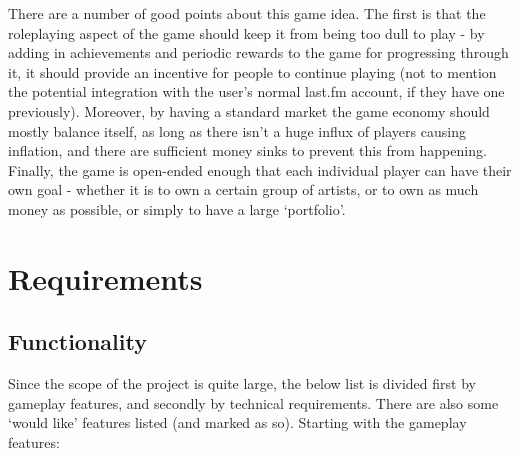 \documentclass[a4paper,10pt,twoside]{article}
\begin{document}
There are a number of good points about this game idea. The first is that the roleplaying aspect of the game should keep it from being too dull to play - by adding in achievements and periodic rewards to the game for progressing through it, it should provide an incentive for people to continue playing (not to mention the potential integration with the user's normal last.fm account, if they have one previously). Moreover, by having a standard market the game economy should mostly balance itself, as long as there isn't a huge influx of players causing inflation, and there are sufficient money sinks to prevent this from happening. Finally, the game is open-ended enough that each individual player can have their own goal - whether it is to own a certain group of artists, or to own as much money as possible, or simply to have a large `portfolio'.

\section{Requirements}
\subsection{Functionality}

Since the scope of the project is quite large, the below list is divided first by gameplay features, and secondly by technical requirements. There are also some `would like' features listed (and marked as so). Starting with the gameplay features:
\end{document}

